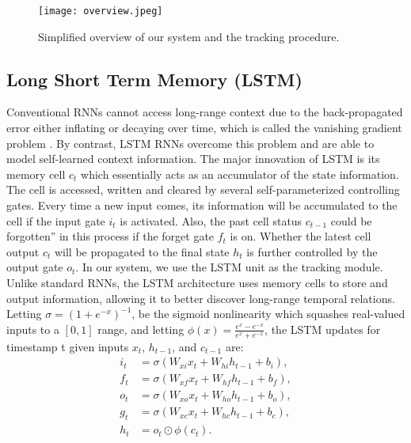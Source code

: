 \documentclass{article}
\begin{document}
\begin{figure}[h] %
      	\centering
      	\captionsetup{justification=centering}
      	\texttt{[image: overview.jpeg]}
      	\caption{Simplified overview of our system and the tracking procedure.}
      	\label{fig-overview}
\end{figure}


\subsection{Long Short Term Memory (LSTM)}
Conventional RNNs cannot access long-range context due to the back-propagated error either inflating or decaying over time, which is called the vanishing gradient problem \citep{ hochreiter2001gradient}.
By contrast, LSTM RNNs \citep{ hochreiter1997long}
overcome this problem and are able to model self-learned context information.
The major innovation of LSTM is its memory cell $c_{t}$ which essentially acts as an accumulator of the state information. The cell is accessed, written and cleared by several self-parameterized controlling gates. Every time a new input comes, its information will be accumulated to the cell if the input gate $i_{t}$ is activated. Also, the past cell status $c_{t-1}$ could be forgotten” in this process if the forget gate $f_{t}$ is on. Whether the latest cell output $c_{t}$ will be propagated to the final state $h_{t}$ is further controlled by the output gate $o_{t}$.
In our system, we use the LSTM unit as the tracking module.
Unlike standard RNNs, the LSTM architecture uses memory cells to store and output information, allowing it to better discover long-range temporal relations.
Letting $\sigma = (1+ e^{-x})^{-1}$,  be the sigmoid nonlinearity which squashes real-valued inputs to a $[0, 1]$ range, and letting $\phi(x) = \frac{e^{x} - e^{-x}}{e^{x} + e^{-x}}$, the LSTM updates for timestamp t given inputs $x_{t}$,  $h_{t-1}$, and $c_{t-1}$ are:
\begin{equation}
	\begin{aligned}
		i_{t} &= \sigma(W_{xi}x_{t} + W_{hi}h_{t-1} + b_{i}), \\
		f_{t} &= \sigma(W_{xf}x_{t} + W_{hf}h_{t-1} + b_{f}), \\
		o_{t} &= \sigma(W_{xo}x_{t} + W_{ho}h_{t-1} + b_{o}), \\
		g_{t} &= \sigma(W_{xc}x_{t} + W_{hc}h_{t-1} + b_{c}), \\
		h_{t} &= o_{t} \odot \phi(c_{t}).
	\end{aligned}
\end{equation}
\end{document}
